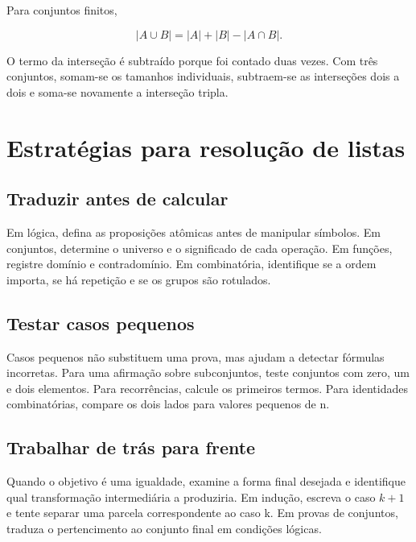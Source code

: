\documentclass[12pt,a4paper,openany]{book}
\begin{document}
Para conjuntos finitos,



\[|A\cup B|=|A|+|B|-|A\cap B|.\]



O termo da interseção é subtraído porque foi contado duas vezes. Com três conjuntos, somam-se os tamanhos individuais, subtraem-se as interseções dois a dois e soma-se novamente a interseção tripla.



\chapter{Estratégias para resolução de listas}



\section{Traduzir antes de calcular}



Em lógica, defina as proposições atômicas antes de manipular símbolos. Em conjuntos, determine o universo e o significado de cada operação. Em funções, registre domínio e contradomínio. Em combinatória, identifique se a ordem importa, se há repetição e se os grupos são rotulados.



\section{Testar casos pequenos}



Casos pequenos não substituem uma prova, mas ajudam a detectar fórmulas incorretas. Para uma afirmação sobre subconjuntos, teste conjuntos com zero, um e dois elementos. Para recorrências, calcule os primeiros termos. Para identidades combinatórias, compare os dois lados para valores pequenos de n.



\section{Trabalhar de trás para frente}



Quando o objetivo é uma igualdade, examine a forma final desejada e identifique qual transformação intermediária a produziria. Em indução, escreva o caso $k+1$ e tente separar uma parcela correspondente ao caso k. Em provas de conjuntos, traduza o pertencimento ao conjunto final em condições lógicas.
\end{document}
